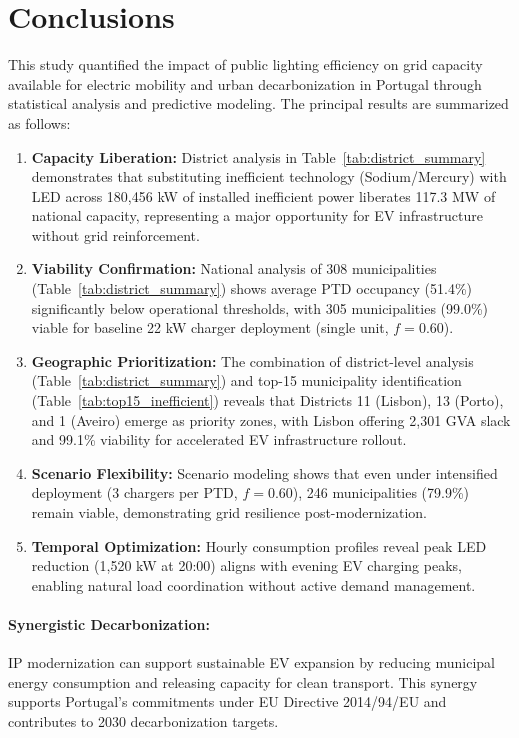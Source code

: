 \documentclass[conference]{IEEEtran}
\begin{document}
\section{Conclusions}

This study quantified the impact of public lighting efficiency on grid capacity available for electric mobility and urban decarbonization in Portugal through statistical analysis and predictive modeling. The principal results are summarized as follows:

\begin{enumerate}
\item \textbf{Capacity Liberation:} District analysis in Table~\ref{tab:district_summary} demonstrates that substituting inefficient technology (Sodium/Mercury) with LED across 180,456 kW of installed inefficient power liberates 117.3 MW of national capacity, representing a major opportunity for EV infrastructure without grid reinforcement.

\item \textbf{Viability Confirmation:} National analysis of 308 municipalities (Table~\ref{tab:district_summary}) shows average PTD occupancy (51.4\%) significantly below operational thresholds, with 305 municipalities (99.0\%) viable for baseline 22 kW charger deployment (single unit, $f=0.60$).

\item \textbf{Geographic Prioritization:} The combination of district-level analysis (Table~\ref{tab:district_summary}) and top-15 municipality identification (Table~\ref{tab:top15_inefficient}) reveals that Districts 11 (Lisbon), 13 (Porto), and 1 (Aveiro) emerge as priority zones, with Lisbon offering 2,301 GVA slack and 99.1\% viability for accelerated EV infrastructure rollout.

\item \textbf{Scenario Flexibility:} Scenario modeling shows that even under intensified deployment (3 chargers per PTD, $f=0.60$), 246 municipalities (79.9\%) remain viable, demonstrating grid resilience post-modernization.

\item \textbf{Temporal Optimization:} Hourly consumption profiles reveal peak LED reduction (1,520 kW at 20:00) aligns with evening EV charging peaks, enabling natural load coordination without active demand management.
\end{enumerate}

\paragraph{Synergistic Decarbonization:} IP modernization can support sustainable EV expansion by reducing municipal energy consumption and releasing capacity for clean transport. This synergy supports Portugal's commitments under EU Directive 2014/94/EU \cite{Grid2020} and contributes to 2030 decarbonization targets.
\end{document}

